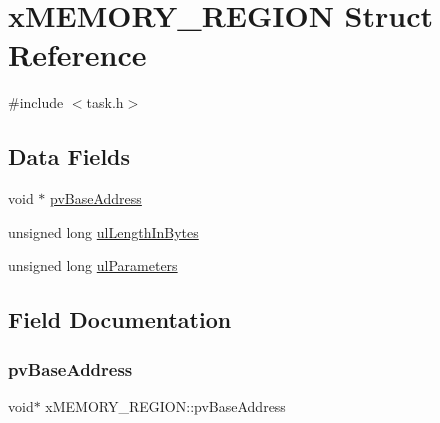 \hypertarget{structx_m_e_m_o_r_y___r_e_g_i_o_n}{}\section{x\+M\+E\+M\+O\+R\+Y\+\_\+\+R\+E\+G\+I\+ON Struct Reference}
\label{structx_m_e_m_o_r_y___r_e_g_i_o_n}


{\ttfamily \#include $<$task.\+h$>$}

\subsection*{Data Fields}
\begin{DoxyCompactItemize}
\item 
void $\ast$ \mbox{\hyperlink{structx_m_e_m_o_r_y___r_e_g_i_o_n_a228036bbfdbc38f170e45deadb166172}{pv\+Base\+Address}}
\item 
unsigned long \mbox{\hyperlink{structx_m_e_m_o_r_y___r_e_g_i_o_n_ac296475c5bdf95765db1786789e3aa4d}{ul\+Length\+In\+Bytes}}
\item 
unsigned long \mbox{\hyperlink{structx_m_e_m_o_r_y___r_e_g_i_o_n_a8750b0cad9c8b2c602ca9f0f2342b3aa}{ul\+Parameters}}
\end{DoxyCompactItemize}


\subsection{Field Documentation}
\mbox{\label{structx_m_e_m_o_r_y___r_e_g_i_o_n_a228036bbfdbc38f170e45deadb166172}} 
\subsubsection{\texorpdfstring{pv\+Base\+Address}{pvBaseAddress}}
{\footnotesize\ttfamily void$\ast$ x\+M\+E\+M\+O\+R\+Y\+\_\+\+R\+E\+G\+I\+O\+N\+::pv\+Base\+Address}

\mbox{\label{structx_m_e_m_o_r_y___r_e_g_i_o_n_ac296475c5bdf95765db1786789e3aa4d}} 
